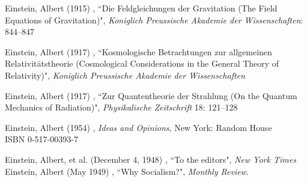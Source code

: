 \documentclass{xetexCV}
\begin{document}
Einstein, Albert (1915) , “Die Feldgleichungen der Gravitation (The Field Equations of Gravitation)", \emph{Koniglich Preussische Akademie der Wissenschaften}: 844–847\medskip

Einstein, Albert (1917) , “Kosmologische Betrachtungen zur allgemeinen Relativitätstheorie (Cosmological Considerations in the General Theory of Relativity)", \emph{Koniglich Preussische Akademie der Wissenschaften}\medskip

Einstein, Albert (1917) , “Zur Quantentheorie der Strahlung (On the Quantum Mechanics of Radiation)", \emph{Physikalische Zeitschrift} 18: 121–128


Einstein, Albert (1954) , \emph{Ideas and Opinions}, New York: Random House\\
ISBN 0-517-00393-7


Einstein, Albert, et al. (December 4, 1948) , “To the editors", \emph{New York Times}\\
Einstein, Albert (May 1949) , “Why Socialism?", \emph{Monthly Review}.
\end{document}
